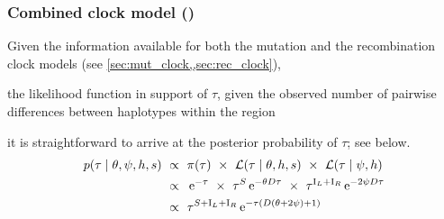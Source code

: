 %
%


%
\subsubsection{Combined clock model (\ClockC)}\label{sec:com_clock}
%


Given the information available for both the mutation and the recombination clock models (see \cref{sec:mut_clock,,sec:rec_clock}),

the likelihood function in support of $\tau$, given the observed number of pairwise differences between  haplotypes within the region



it is straightforward to arrive at the posterior probability of $\tau$; see below.
\begin{equation}\label{eq:com_post}
\begin{split}
	p(\tau \mid \theta,\psi,h,s)
	& ~\propto~
	\pi(\tau) ~\times~
	\mathcal{L}(\tau \mid \theta, h, s) ~\times~
	\mathcal{L}(\tau \mid \psi, h) \\
	& ~\propto~
	\,\mathrm{e}^{-\tau} ~\times~
	\tau^S \,\mathrm{e}^{-\theta D \tau} ~\times~
	\tau^{\mathrm{I}_L + \mathrm{I}_R} \,\mathrm{e}^{-2 \psi D \tau} \\
	& ~\propto~
	\tau^{S + \mathrm{I}_L + \mathrm{I}_R} \,\mathrm{e}^{-\tau (D(\theta + 2 \psi) + 1)}
\end{split}
\end{equation}

